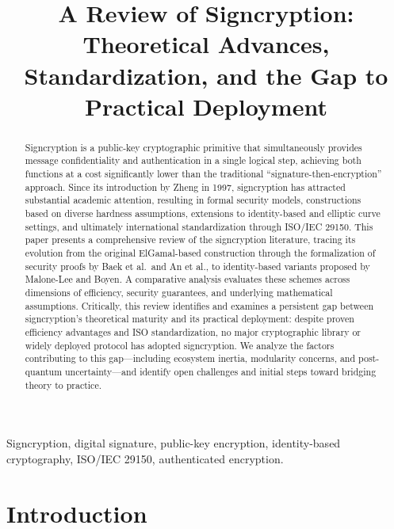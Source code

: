 \documentclass[conference]{IEEEtran}
\begin{document}
\title{A Review of Signcryption: Theoretical Advances, Standardization, and the Gap to Practical Deployment}

\author{
}

\maketitle

\begin{abstract}
Signcryption is a public-key cryptographic primitive that simultaneously provides message confidentiality and authentication in a single logical step, achieving both functions at a cost significantly lower than the traditional ``signature-then-encryption'' approach. Since its introduction by Zheng in 1997, signcryption has attracted substantial academic attention, resulting in formal security models, constructions based on diverse hardness assumptions, extensions to identity-based and elliptic curve settings, and ultimately international standardization through ISO/IEC 29150. This paper presents a comprehensive review of the signcryption literature, tracing its evolution from the original ElGamal-based construction through the formalization of security proofs by Baek et al.\ and An et al., to identity-based variants proposed by Malone-Lee and Boyen. A comparative analysis evaluates these schemes across dimensions of efficiency, security guarantees, and underlying mathematical assumptions. Critically, this review identifies and examines a persistent gap between signcryption's theoretical maturity and its practical deployment: despite proven efficiency advantages and ISO standardization, no major cryptographic library or widely deployed protocol has adopted signcryption. We analyze the factors contributing to this gap---including ecosystem inertia, modularity concerns, and post-quantum uncertainty---and identify open challenges and initial steps toward bridging theory to practice.
\end{abstract}

\begin{IEEEkeywords}
Signcryption, digital signature, public-key encryption, identity-based cryptography, ISO/IEC 29150, authenticated encryption.
\end{IEEEkeywords}

\section{Introduction}
\end{document}
